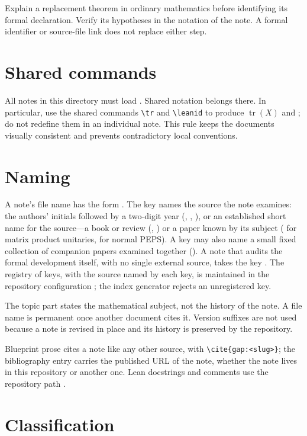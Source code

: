 \documentclass{article}
\providecommand{\leanid}[1]{\textsf{\detokenize{#1}}}
\providecommand{\tr}{\operatorname{tr}}
\begin{document}
Explain a replacement theorem in ordinary mathematics before identifying its
formal declaration. Verify its hypotheses in the notation of the note. A
formal identifier or source-file link does not replace either step.

\section{Shared commands}

All notes in this directory must load
. Shared notation belongs there. In
particular, use the shared commands \verb|\tr| and \verb|\leanid| to produce
$\tr(X)$ and \leanid{someDeclaration}; do not redefine them in an individual
note. This rule keeps the documents visually consistent and prevents
contradictory local conventions.

\section{Naming}

A note's file name has the form . The key names the
source the note examines: the authors' initials followed by a two-digit year
(, , ), or an established short name
for the source---a book or review (, ) or a paper known by
its subject ( for matrix product unitaries,  for normal
PEPS). A key may also name a small fixed collection of companion papers
examined together (). A note that audits the formal development
itself, with no single external source, takes the key . The
registry of keys, with the source named by each key, is maintained in the
repository configuration ; the index generator
rejects an unregistered key.

The topic part states the mathematical subject, not the history of the note. A
file name is permanent once another document cites it. Version suffixes are not
used because a note is revised in place and its history is preserved by the
repository.

Blueprint prose cites a note like any other source, with
\verb|\cite{gap:<slug>}|; the bibliography entry carries the published URL of
the note, whether the note lives in this repository or another one. Lean
docstrings and comments use the repository path
.

\section{Classification}
\end{document}
